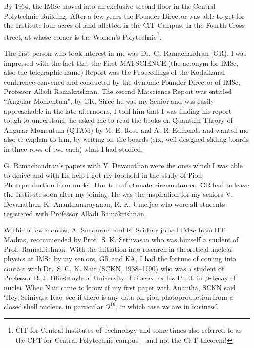 By 1964, the IMSc moved into an exclusive second floor in the Central Polytechnic Building. After a few years the Founder Director was able to get for the Institute four acres of land allotted in the CIT Campus,  in the Fourth Cross street, at whose corner is the Women's Polytechnic\footnote{CIT for Central Institutes of Technology and some times also referred to as the CPT for Central Polytechnic campus -- and not the CPT-theorem!}.

The first person who took interest in me was Dr.\ G. Ramachandran (GR). I was impressed with the fact that the First MATSCIENCE (the acronym for IMSc, also the telegraphic name) Report was the Proceedings of the Kodaikanal conference convened and conducted by the dynamic Founder Director of IMSc, Professor Alladi Ramakrishnan. The second Matscience Report was entitled ``Angular Momentum", by GR. Since he was my Senior and was easily approachable in the late afternoons, I told him that I was finding his report tough to understand, he asked me to read the books on Quantum Theory of Angular Momentum (QTAM) by M. E.  Rose and A. R. Edmonds and wanted me also to explain to him, by writing on the boards (six, well-designed sliding boards in three rows of two each) what I had studied.

G. Ramachandran's papers with V. Devanathan were the ones which I was able to derive and with his help I got my foothold in the study of Pion Photoproduction from nuclei. Due to unfortunate circumstances, GR had to leave the Institute soon after my joining. He was the inspiration for my seniors V. Devanathan, K.  Ananthanarayanan, R. K. Umerjee who were all students registered with Professor Alladi Ramakrishnan.

Within a few months, A. Sundaram and R. Sridhar joined IMSc from IIT Madras, recommended by Prof.\ S. K. Srinivasan who was himself a student of Prof.\ Ramakrishnan. With the initiation into research in theoretical nuclear physics at IMSc by my seniors, GR and KA, I had the fortune of coming into contact with Dr.\ S. C. K. Nair (SCKN, 1938--1990) who was a student of Professor R. J. Blin-Stoyle of University of Sussex for his Ph.D. in $\beta$-decay of nuclei. When Nair came to know of my first paper with Anantha, SCKN said `Hey, Srinivasa Rao, see if there is any data on pion photoproduction from a closed shell nucleus, in particular $O^{16}$, in which case we are in business'.

